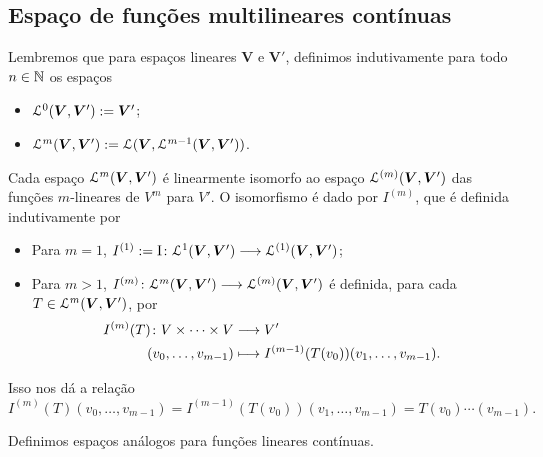 

\subsection{Espaço de funções multilineares contínuas}

Lembremos que para espaços lineares $\bm V$ e $\bm V'$, definimos indutivamente para todo $n \in \mathbb{N}$ os espaços
	\begin{itemize}
	\item $\mathcal{L}^0(\bm V, \bm V') := \bm V'$;
	\item $\mathcal{L}^m(\bm V, \bm V') := \mathcal{L}(\bm V, \mathcal{L}^{m-1}(\bm V, \bm V'))$.
	\end{itemize}
Cada espaço $\mathcal{L}^m(\bm V, \bm V')$ é linearmente isomorfo ao espaço $\mathcal{L}^{(m)}(\bm V, \bm V')$ das funções $m$-lineares de $V^m$ para $V'$. O isomorfismo é dado por $I^{(m)}$, que é definida indutivamente por
	\begin{itemize}
	\item Para $m=1$, $I^{(1)} := \mathrm{I}\colon \allowbreak \mathcal{L}^1(\bm V, \bm V') \longrightarrow \mathcal{L}^{(1)}(\bm V, \bm V')$;
	\item Para $m>1$, $I^{(m)}\colon \allowbreak \mathcal{L}^m(\bm V, \bm V') \longrightarrow \mathcal{L}^{(m)}(\bm V, \bm V')$ é definida, para cada $T \in \mathcal{L}^m(\bm V, \bm V')$, por
		\begin{align*}
		{I^{(m)}(T)}\colon {V \times \cdots \times V} &\longrightarrow {V'} \\{(v_0,\ldots, v_{m-1})} &\longmapsto I^{(m-1)}(T(v_0))(v_1,\ldots, v_{m-1}).
		\end{align*}
	\end{itemize}

Isso nos dá a relação
	\begin{equation*}
	I^{(m)}(T)(v_0, \ldots, v_{m-1}) = I^{(m-1)}(T(v_0))(v_1,\ldots, v_{m-1}) = T(v_0)\cdots(v_{m-1}).
	\end{equation*}

Definimos espaços análogos para funções lineares contínuas.

